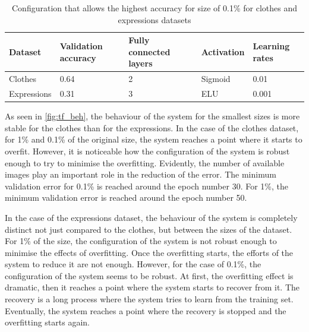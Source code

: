 \documentclass{article}
\begin{document}
\begin{table}[!htb]
  \centering
  \begin{tabular}{| l | l | l | l | l |}
    \hline
    \textbf{Dataset} & \textbf{Validation accuracy} & \textbf{Fully connected layers}& \textbf{Activation} & \textbf{Learning rates}\\ \hline
    Clothes & 0.64 & 2 & Sigmoid & 0.01 \\ \hline
    Expressions & 0.31  & 3 & ELU & 0.001 \\ \hline
  \end{tabular}
  \caption{Configuration that allows the highest accuracy for size of 0.1\% for clothes and expressions datasets}
  \label{tab:tf_1}
\end{table}

As seen in \ref{fig:tf_beh}, the behaviour of the system for the smallest sizes is more stable for the clothes than for the expressions. In the case of the clothes dataset, for 1\% and 0.1\% of the original size, the system reaches a point where it starts to overfit. However, it is noticeable how the configuration of the system is robust enough to try to minimise the overfitting. Evidently, the number of available images play an important role in the reduction of the error. The minimum validation error for 0.1\% is reached around the epoch number 30. For 1\%, the minimum validation error is reached around the epoch number 50.

In the case of the expressions dataset, the behaviour of the system is completely distinct not just compared to the clothes, but between the sizes of the dataset. For 1\% of the size, the configuration of the system is not robust enough to minimise the effects of overfitting. Once the overfitting starts, the efforts of the system to reduce it are not enough. However, for the case of 0.1\%, the configuration of the system seems to be robust.  At first, the overfitting effect is dramatic, then it reaches a point where the system starts to recover from it. The recovery is a long process where the system tries to learn from the training set. Eventually, the system reaches a point where the recovery is stopped and the overfitting starts again.
\end{document}

